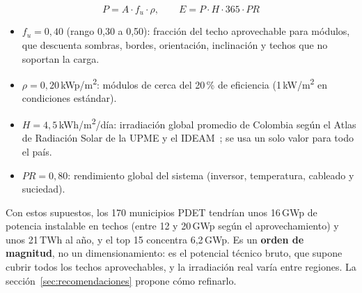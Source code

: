 \begin{equation}
  P = A \cdot f_u \cdot \rho, \qquad E = P \cdot H \cdot 365 \cdot PR
  \label{eq:potencial}
\end{equation}

\begin{itemize}
  \item $f_u = 0{,}40$ (rango 0,30 a 0,50): fracción del techo aprovechable
        para módulos, que descuenta sombras, bordes, orientación,
        inclinación y techos que no soportan la carga.
  \item $\rho = 0{,}20$\,kWp/m\textsuperscript{2}: módulos de cerca del
        20\,\% de eficiencia (1\,kW/m\textsuperscript{2} en condiciones
        estándar).
  \item $H = 4{,}5$\,kWh/m\textsuperscript{2}/día: irradiación global
        promedio de Colombia según el Atlas de Radiación Solar de la UPME y
        el IDEAM~\cite{atlas}; se usa un solo valor para todo el país.
  \item $PR = 0{,}80$: rendimiento global del sistema (inversor, temperatura,
        cableado y suciedad).
\end{itemize}


Con estos supuestos, los 170 municipios PDET tendrían unos 16\,GWp de potencia
instalable en techos (entre 12 y 20\,GWp según el aprovechamiento) y unos
21\,TWh al año, y el top 15 concentra 6,2\,GWp. Es un \textbf{orden de
magnitud}, no un dimensionamiento: es el potencial técnico bruto, que supone
cubrir todos los techos aprovechables, y la irradiación real varía entre
regiones. La sección~\ref{sec:recomendaciones} propone cómo refinarlo.
